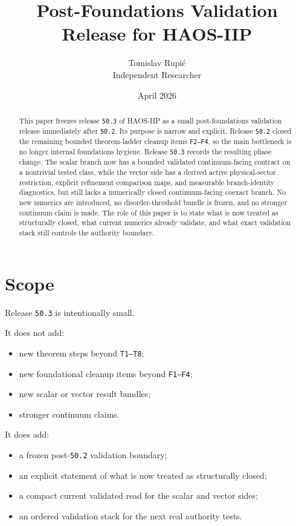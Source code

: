 \documentclass[11pt]{article}
\title{Post-Foundations Validation Release for HAOS-IIP}
\author{Tomislav Rupi\'c \\ Independent Researcher}
\date{April 2026}
\begin{document}
\maketitle

\begin{abstract}
This paper freezes release \texttt{50.3} of HAOS-IIP as a small post-foundations validation release immediately after \texttt{50.2}. Its purpose is narrow and explicit. Release \texttt{50.2} closed the remaining bounded theorem-ladder cleanup items \texttt{F2--F4}, so the main bottleneck is no longer internal foundations hygiene. Release \texttt{50.3} records the resulting phase change. The scalar branch now has a bounded validated continuum-facing contract on a nontrivial tested class, while the vector side has a derived active physical-sector restriction, explicit refinement comparison maps, and measurable branch-identity diagnostics, but still lacks a numerically closed continuum-facing coexact branch. No new numerics are introduced, no disorder-threshold bundle is frozen, and no stronger continuum claim is made. The role of this paper is to state what is now treated as structurally closed, what current numerics already validate, and what exact validation stack still controls the authority boundary.
\end{abstract}

\tableofcontents

\section{Scope}

Release \texttt{50.3} is intentionally small.

It does not add:
\begin{itemize}
\item new theorem steps beyond \texttt{T1--T8};
\item new foundational cleanup items beyond \texttt{F1--F4};
\item new scalar or vector result bundles;
\item stronger continuum claims.
\end{itemize}

It does add:
\begin{itemize}
\item a frozen post-\texttt{50.2} validation boundary;
\item an explicit statement of what is now treated as structurally closed;
\item a compact current validated read for the scalar and vector sides;
\item an ordered validation stack for the next real authority tests.
\end{itemize}
\end{document}
